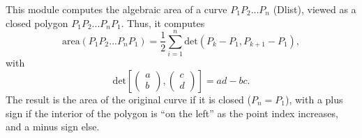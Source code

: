 This module computes the algebraic area of a curve $P_1P_2...P_n$
(Dlist), viewed as a closed polygon $P_1P_2...P_nP_1$. Thus, it computes
$$\mathrm{area} (P_1P_2...P_nP_1)= \frac 12 \sum_{i=1}^n \mathrm{det}
(P_k-P_1,P_{k+1}-P_1),$$
with
$$\mathrm{det}\left[\left(\begin{array}{l}a\\b\end{array}\right),\left(\begin{array}{l}c\\d\end{array}\right)\right] = ad-bc.$$
The result is the area of the original curve if it is closed 
($P_n=P_1$), with a plus sign if the interior of the polygon is ``on the
left'' as the point index increases, and a minus sign else.

